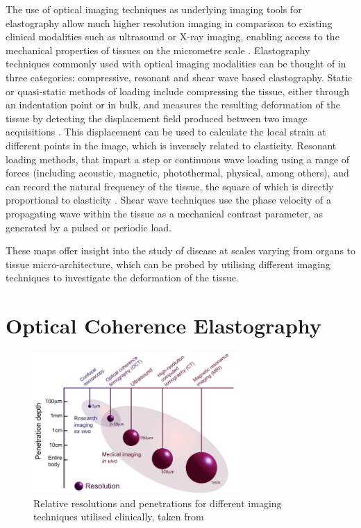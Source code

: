 The use of optical imaging techniques as underlying imaging tools for elastography allow much higher resolution imaging in comparison to existing clinical modalities such as ultrasound or X-ray imaging, enabling access to the mechanical properties of tissues on the micrometre scale \cite{schmitt_oct_1998} \cite{kennedy_review_2014}. Elastography techniques commonly used with optical imaging modalities can be thought of in three categories: compressive, resonant and shear wave based elastography. Static or quasi-static methods of loading include compressing the tissue, either through an indentation point or in bulk, and measures the resulting deformation of the tissue by detecting the displacement field produced between two image acquisitions \cite{kennedy_optical_2014}. This displacement can be used to calculate the local strain at different points in the image, which is inversely related to elasticity. Resonant loading methods, that impart a step or continuous wave loading using a range of forces (including acoustic, magnetic, photothermal, physical, among others), and can record the natural frequency of the tissue, the square of which is directly proportional to elasticity \cite{kennedy_optical_2015}. Shear wave techniques use the phase velocity of a propagating wave within the tissue as a mechanical contrast parameter, as generated by a pulsed or periodic load. 

These maps offer insight into the study of disease at scales varying from organs to tissue micro-architecture, which can be probed by utilising different imaging techniques to investigate the deformation of the tissue.

\section{Optical Coherence Elastography}\label{solution}

\begin{figure}[b!]
	\centering
    	\includegraphics[width=0.7\textwidth]{bground_figs/technique_comparison.png}
    	\caption{Relative resolutions and penetrations for different imaging techniques utilised clinically, taken from \cite{optical+biomedical_engineering_laboratory_introduction_nodate}}
    	\label{image_techniques}	
\end{figure}

